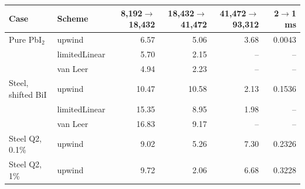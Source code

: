 \begin{tabular}{llrrrr}
\toprule
Case & Scheme & 8,192$\to$18,432 & 18,432$\to$41,472 & 41,472$\to$93,312 & 2$\to$1 ms \\
\midrule
Pure PbI$_2$ & upwind & 6.57 & 5.06 & 3.68 & 0.0043 \\
 & limitedLinear & 5.70 & 2.15 & -- & -- \\
 & van Leer & 4.94 & 2.23 & -- & -- \\
\midrule
Steel, shifted BiI & upwind & 10.47 & 10.58 & 2.13 & 0.1536 \\
 & limitedLinear & 15.35 & 8.95 & 1.98 & -- \\
 & van Leer & 16.83 & 9.17 & -- & -- \\
\midrule
Steel Q2, 0.1\% & upwind & 9.02 & 5.26 & 7.30 & 0.2326 \\
\midrule
Steel Q2, 1\% & upwind & 9.72 & 2.06 & 6.68 & 0.3228 \\
\bottomrule
\end{tabular}
